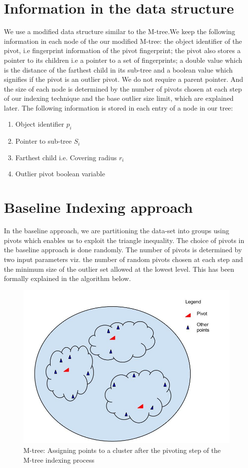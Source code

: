 \section{Information in the data structure}

We use a modified data structure similar to the M-tree.We keep the following information in each node of the our modified M-tree: the object identifier of the pivot, i.e fingerprint information of the pivot fingerprint; the pivot also stores a pointer to its children i.e a pointer to a set of fingerprints; a double value which is the distance of the farthest child in its sub-tree and a boolean value which signifies if the pivot is an outlier pivot. We do not require a parent pointer. And the size of each node is determined by the number of pivots chosen at each step of our indexing technique and the base outlier size limit, which are explained later. The following information is stored in each entry of a node in our tree:

\begin{enumerate}
	\item Object identifier $p_i$
	\item Pointer to sub-tree $S_i$
	\item Farthest child i.e. Covering radius $r_i$
	\item Outlier pivot boolean variable
\end{enumerate}

\section{Baseline Indexing approach}
In the baseline approach, we are partitioning the data-set into groups using pivots which enables us to exploit the triangle inequality. The choice of pivots in the baseline approach is done randomly. The number of pivots is determined by two input parameters viz. the number of random pivots chosen at each step and the minimum size of the outlier set allowed at the lowest level. This has been formally explained in the algorithm below. \\

\begin{figure}[ht]	
\centering
\includegraphics[width=0.7 \columnwidth]{img/image0a.jpg}
\caption{M-tree: Assigning points to a cluster after the pivoting step of the M-tree indexing process}
\label{fig:4.1}
\end{figure}

